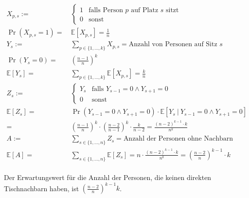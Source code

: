 \begin{align*}
	X_{p, s} := &\ \begin{cases}
		1 & \text{falls Person $p$ auf Platz $s$ sitzt} \\
		0 & \text{sonst}
	\end{cases} \\
	\Pr(X_{p, s} = 1) = &\ \mathbb{E}[X_{p, s}] = \frac{1}{n} \\
	Y_s := &\ \sum_{p \in \{ 1, \dots, k \}} X_{p, s} = \text{Anzahl von Personen auf Sitz $s$} \\
	\Pr(Y_s = 0) = &\ \left( \frac{n - 1}{n} \right)^{k} \\
	\mathbb{E}[Y_s] = &\ \sum_{p \in \{ 1, \dots, k \}} \mathbb{E}[X_{p, s}] = \frac{k}{n} \\
	Z_s := &\ \begin{cases}
		Y_s & \text{falls } Y_{s - 1} = 0 \land Y_{s + 1} = 0 \\
		0 & \text{sonst}
	\end{cases} \\
	\mathbb{E}[Z_s] = &\ \Pr(Y_{s - 1} = 0 \land Y_{s + 1} = 0) \cdot \mathbb{E}[Y_s\ |\ Y_{s - 1} = 0 \land Y_{s + 1} = 0] \\
	= &\ \left( \frac{n - 1}{n} \right)^{k} \cdot \left( \frac{n - 2}{n - 1} \right)^{k} \cdot \frac{k}{n - 2} = \frac{(n - 2)^{k - 1} \cdot k}{n^k} \\
	A := &\ \sum_{s \in \{ 1, \dots, n \}} Z_s = \text{Anzahl der Personen ohne Nachbarn} \\
	\mathbb{E}[A] = &\ \sum_{s \in \{ 1, \dots, n \}} \mathbb{E}[Z_s]
	= n \cdot \frac{(n - 2)^{k - 1} \cdot k}{n^k} = \left( \frac{n - 2}{n} \right)^{k - 1} \cdot k
\end{align*} \\
Der Erwartungswert für die Anzahl der Personen, die keinen direkten Tischnachbarn haben, ist $\left( \frac{n - 2}{n} \right)^{k - 1} k$.


